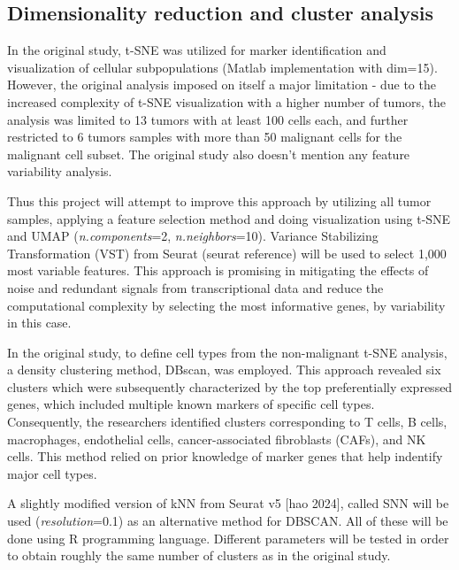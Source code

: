 \documentclass[11pt]{article}
\begin{document}
\subsection{Dimensionality reduction and cluster analysis}
\begin{multicols}{2}
    \noindent
    In the original study, t-SNE was utilized for marker identification and visualization of cellular subpopulations (Matlab implementation with dim=15). However, the original analysis imposed on itself a major limitation - due to the increased complexity of t-SNE visualization with a higher number of tumors, the analysis was limited to 13 tumors with at least 100 cells each, and further restricted to 6 tumors samples with more than 50 malignant cells for the malignant cell subset. The original study also doesn't mention any feature variability analysis.

    Thus this project will attempt to improve this approach by utilizing all tumor samples, applying a feature selection method and doing visualization using t-SNE and UMAP (\textit{n.components}=2, \textit{n.neighbors}=10). Variance Stabilizing Transformation (VST) from Seurat (seurat reference) will be used to select 1,000 most variable features. This approach is promising in mitigating the effects of noise and redundant signals from transcriptional data and reduce the computational complexity by selecting the most informative genes, by variability in this case.
    
    In the original study, to define cell types from the non-malignant t-SNE analysis, a density clustering method, DBscan, was employed. This approach revealed six clusters which were subsequently characterized by the top preferentially expressed genes, which included multiple known markers of specific cell types. Consequently, the researchers identified clusters corresponding to T cells, B cells, macrophages, endothelial cells, cancer-associated fibroblasts (CAFs), and NK cells. This method relied on prior knowledge of marker genes that help indentify major cell types.

    A slightly modified version of kNN from Seurat v5 [hao 2024], called SNN will be used (\textit{resolution}=0.1) as an alternative method for DBSCAN. All of these will be done using R programming language. Different parameters will be tested in order to obtain roughly the same number of clusters as in the original study.
    
\end{multicols}
\end{document}
